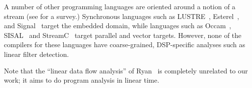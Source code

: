 A number of other programming languages are oriented around a notion
of a stream (see \cite{survey97} for a survey.)  Synchronous languages
such as LUSTRE~\cite{lustre}, Esterel~\cite{esterel92}, and
Signal~\cite{signal} target the embedded domain, while languages such
as Occam~\cite{occam}, SISAL~\cite{sisal} and StreamC~\cite{Rix98}
target parallel and vector targets.  However, none of the compilers
for these languages have coarse-grained, DSP-specific analyses such as
linear filter detection.

Note that the ``linear data flow analysis'' of Ryan~\cite{ryan92} is
completely unrelated to our work; it aims to do program analysis in
linear time.

